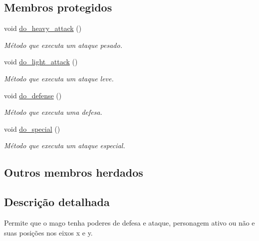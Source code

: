 \subsection*{Membros protegidos}
\begin{DoxyCompactItemize}
\item 
\mbox{\label{classMage_a83840130ab4e67e41f3a1fd435e55f9c}} 
void \mbox{\hyperlink{classMage_a83840130ab4e67e41f3a1fd435e55f9c}{do\+\_\+heavy\+\_\+attack}} ()
\begin{DoxyCompactList}\small\item\em Método que executa um ataque pesado. \end{DoxyCompactList}\item 
\mbox{\label{classMage_abf137f2de54b6ba08fb12805ff00ec6d}} 
void \mbox{\hyperlink{classMage_abf137f2de54b6ba08fb12805ff00ec6d}{do\+\_\+light\+\_\+attack}} ()
\begin{DoxyCompactList}\small\item\em Método que executa um ataque leve. \end{DoxyCompactList}\item 
\mbox{\label{classMage_a0ce2899b0e49e1bbe47c04149f307218}} 
void \mbox{\hyperlink{classMage_a0ce2899b0e49e1bbe47c04149f307218}{do\+\_\+defense}} ()
\begin{DoxyCompactList}\small\item\em Método que executa uma defesa. \end{DoxyCompactList}\item 
\mbox{\label{classMage_aae5afc391b9d8105cfa98ca2f3a1646b}} 
void \mbox{\hyperlink{classMage_aae5afc391b9d8105cfa98ca2f3a1646b}{do\+\_\+special}} ()
\begin{DoxyCompactList}\small\item\em Método que executa um ataque especial. \end{DoxyCompactList}\end{DoxyCompactItemize}
\subsection*{Outros membros herdados}


\subsection{Descrição detalhada}
Permite que o mago tenha poderes de defesa e ataque, personagem ativo ou não e suas posições nos eixos x e y. 


